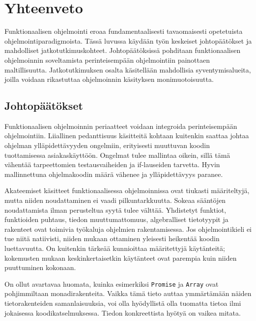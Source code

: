 \vspace{21.5pt}
\chapter{Yhteenveto}

Funktionaalisen ohjelmointi eroaa fundamentaalisesti tavaomaisesti opetetuista ohjelmointiparadigmoista. Tässä luvussa käydään työn keskeiset johtopäätökset ja mahdolliset jatkotutkimuskohteet. Johtopäätöksissä pohditaan funktionaalisen ohjelmoinnin soveltamista perinteisempään ohjelmointiin painottaen maltillisuutta. Jatkotutkimuksen osalta käsitellään mahdollisia syventymisalueita, joilla voidaan rikastuttaa ohjelmoinnin käsityksen monimuotoisuutta.

\section{Johtopäätökset}

Funktionaalisen ohjelmoinnin periaatteet voidaan integroida perinteisempään ohjelmointiin. Liiallinen pedanttisuus käsitteitä kohtaan kuitenkin saattaa johtaa ohjelman ylläpidettävyyden ongelmiin, erityisesti muuttuvan koodin tuottamisessa asiakaskäyttöön. Ongelmat tulee mallintaa oikein, sillä tämä vähentää tarpeettomien testausvaiheiden ja if-lauseiden tarvetta. Hyvin mallinnettuna ohjelmakoodin määrä vähenee ja ylläpidettävyys paranee.

Akateemiset käsitteet funktionaalisessa ohjelmoinnissa ovat tiukasti määriteltyjä, mutta niiden noudattaminen ei vaadi pilkuntarkkuutta. Sokeaa sääntöjen noudattamista ilman perusteltua syytä tulee välttää. Yhdistetyt funktiot, funktioiden puhtaus, tiedon muuttumattomuus, algebralliset tietotyypit ja rakenteet ovat toimivia työkaluja ohjelmien rakentamisessa. Jos ohjelmointikieli ei tue niitä natiivisti, niiden mukaan ottaminen yleisesti heikentää koodin luettavuutta. On kuitenkin tärkeää kunnioittaa määritettyjä käytänteitä; kokemusten mukaan keskinkertaisetkin käytänteet ovat parempia kuin niiden puuttuminen kokonaan.

On ollut avartavaa huomata, kuinka esimerkiksi \texttt{Promise} ja \texttt{Array} ovat pohjimmiltaan monadirakenteita. Vaikka tämä tieto auttaa ymmärtämään näiden tietorakenteiden samanlaisuuksia, voi olla hyödyllistä olla tuomatta tietoa ilmi jokaisessa koodikatselmuksessa. Tiedon konkreettista hyötyä on vaikea mitata.

